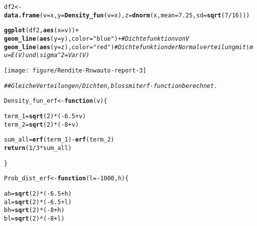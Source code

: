 \documentclass{article}\usepackage[]{graphicx}\usepackage[]{color}
\makeatletter
\newcommand{\hlnum}[1]{\textcolor[rgb]{0.686,0.059,0.569}{#1}}%
\newcommand{\hlstr}[1]{\textcolor[rgb]{0.192,0.494,0.8}{#1}}%
\newcommand{\hlcom}[1]{\textcolor[rgb]{0.678,0.584,0.686}{\textit{#1}}}%
\newcommand{\hlopt}[1]{\textcolor[rgb]{0,0,0}{#1}}%
\newcommand{\hlstd}[1]{\textcolor[rgb]{0.345,0.345,0.345}{#1}}%
\newcommand{\hlkwa}[1]{\textcolor[rgb]{0.161,0.373,0.58}{\textbf{#1}}}%
\newcommand{\hlkwb}[1]{\textcolor[rgb]{0.69,0.353,0.396}{#1}}%
\newcommand{\hlkwc}[1]{\textcolor[rgb]{0.333,0.667,0.333}{#1}}%
\newcommand{\hlkwd}[1]{\textcolor[rgb]{0.737,0.353,0.396}{\textbf{#1}}}%
\newenvironment{kframe}{%
 \def\at@end@of@kframe{}%
 \ifinner\ifhmode%
  \def\at@end@of@kframe{\end{minipage}}%
  \begin{minipage}{\columnwidth}%
 \fi\fi%
 \def\FrameCommand##1{\hskip\@totalleftmargin \hskip-\fboxsep
 \colorbox{shadecolor}{##1}\hskip-\fboxsep
     \hskip-\linewidth \hskip-\@totalleftmargin \hskip\columnwidth}%
 \MakeFramed {\advance\hsize-\width
   \@totalleftmargin\z@ \linewidth\hsize
   \@setminipage}}%
 {\par\unskip\endMakeFramed%
 \at@end@of@kframe}
\newenvironment{knitrout}{}{} %
\makeatother
\begin{document}
\begin{knitrout}
{}


\begin{kframe}\begin{alltt}
\hlstd{df2} \hlkwb{<-} \hlkwd{data.frame}\hlstd{(}\hlkwc{v}\hlstd{=x,} \hlkwc{y} \hlstd{=} \hlkwd{Density_fun}\hlstd{(}\hlkwc{v}\hlstd{=x),} \hlkwc{z} \hlstd{=} \hlkwd{dnorm}\hlstd{(x,}\hlkwc{mean}\hlstd{=} \hlnum{7.25}\hlstd{,}\hlkwc{sd} \hlstd{=} \hlkwd{sqrt}\hlstd{(}\hlnum{7}\hlopt{/}\hlnum{16}\hlstd{)) )}

\hlkwd{ggplot}\hlstd{(df2,} \hlkwd{aes}\hlstd{(}\hlkwc{x}\hlstd{=v))}\hlopt{+}
  \hlkwd{geom_line}\hlstd{(}\hlkwd{aes}\hlstd{(}\hlkwc{y}\hlstd{=y),}\hlkwc{color} \hlstd{=} \hlstr{"blue"}\hlstd{)}\hlopt{+}  \hlcom{#Dichtefunktion von V}
  \hlkwd{geom_line}\hlstd{(}\hlkwd{aes}\hlstd{(}\hlkwc{y}\hlstd{=z),}\hlkwc{color} \hlstd{=} \hlstr{"red"}\hlstd{)}    \hlcom{#Dichtefunktion der Normalverteilung mit \textbackslash{}mu = E(V) und \textbackslash{}sigma^2 = Var(V)}
\end{alltt}
\end{kframe}

{\centering \texttt{[image: figure/Rendite-Rnwauto-report-3]} 

}


\begin{kframe}\begin{alltt}
\hlcom{## Gleiche Verteilungen/Dichten, bloss mit erf-function berechnet.}

\hlstd{Density_fun_erf} \hlkwb{<-} \hlkwa{function}\hlstd{(}\hlkwc{v}\hlstd{)\{}

  \hlstd{term_1} \hlkwb{=} \hlkwd{sqrt}\hlstd{(}\hlnum{2}\hlstd{)}\hlopt{*}\hlstd{(}\hlopt{-}\hlnum{6.5} \hlopt{+} \hlstd{v)}
  \hlstd{term_2} \hlkwb{=} \hlkwd{sqrt}\hlstd{(}\hlnum{2}\hlstd{)}\hlopt{*}\hlstd{(}\hlopt{-}\hlnum{8} \hlopt{+} \hlstd{v)}

  \hlstd{sum_all} \hlkwb{=} \hlkwd{erf}\hlstd{(term_1)}\hlopt{-} \hlkwd{erf}\hlstd{(term_2)}
  \hlkwd{return}\hlstd{(}\hlnum{1}\hlopt{/}\hlnum{3} \hlopt{*} \hlstd{sum_all)}

\hlstd{\}}



\hlstd{Prob_dist_erf} \hlkwb{<-} \hlkwa{function}\hlstd{(}\hlkwc{l}\hlstd{=}\hlopt{-}\hlnum{1000}\hlstd{,}\hlkwc{h}\hlstd{)\{}

  \hlstd{ah} \hlkwb{=} \hlkwd{sqrt}\hlstd{(}\hlnum{2}\hlstd{)}\hlopt{*}\hlstd{(}\hlopt{-}\hlnum{6.5} \hlopt{+} \hlstd{h)}
  \hlstd{al} \hlkwb{=} \hlkwd{sqrt}\hlstd{(}\hlnum{2}\hlstd{)}\hlopt{*}\hlstd{(}\hlopt{-}\hlnum{6.5} \hlopt{+} \hlstd{l)}
  \hlstd{bh} \hlkwb{=} \hlkwd{sqrt}\hlstd{(}\hlnum{2}\hlstd{)}\hlopt{*}\hlstd{(}\hlopt{-}\hlnum{8} \hlopt{+} \hlstd{h)}
  \hlstd{bl} \hlkwb{=} \hlkwd{sqrt}\hlstd{(}\hlnum{2}\hlstd{)}\hlopt{*}\hlstd{(}\hlopt{-}\hlnum{8} \hlopt{+} \hlstd{l)}


\end{alltt}
\end{kframe}
\end{knitrout}
\end{document}
